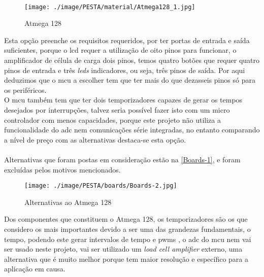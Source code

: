 \\
\begin{figure}[H]
	\centering
	\texttt{[image: ./image/PESTA/material/Atmega128\_1.jpg]}
	\caption{Atmega 128}
	\label{Atmega_128_pinagem}
\end{figure}
Esta opção preenche os requisitos requeridos, por ter portas de entrada e saída suficientes, porque o \acs{lcd} requer a utilização de oito pinos para funcionar, o amplificador de célula de carga dois pinos, temos quatro botões que requer quatro pinos de entrada e três \textit{leds} indicadores, ou seja, três pinos de saída. Por aqui deduzimos que o \acs{mcu} a escolher tem que ter mais do que dezasseis pinos só para os periféricos.
\\
O \acs{mcu} também tem que ter dois temporizadores capazes de gerar os tempos desejados por interrupções, talvez seria possível fazer isto com um micro controlador com menos capacidades, porque este projeto não utiliza a funcionalidade do \acs{adc} nem comunicações série integradas, no entanto comparando a nível de preço com as alternativas destaca-se esta opção.
\\
\\
Alternativas que foram postas em consideração estão na \autoref{Boards-1}, e foram excluídas pelos motivos mencionados.
\\
\begin{figure}[H]
	\centering
	\texttt{[image: ./image/PESTA/boards/Boards-2.jpg]}
	\caption{Alternativas ao Atmega 128}
	\label{Boards-1}
\end{figure}
Dos componentes que constituem o Atmega 128, os temporizadores são os que considero os mais importantes devido a ser uma das grandezas fundamentais, o tempo, podendo este gerar intervalos de tempo e \acp{pwm}
, o \ac{adc} do \acs{mcu} nem vai ser usado neste projeto, vai ser utilizado um \textit{load cell amplifier} externo, uma alternativa que é muito melhor porque tem maior resolução e específico para a aplicação em causa.
\\
\\
